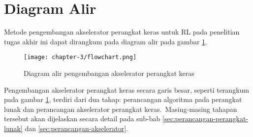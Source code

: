 \section{Diagram Alir}

Metode pengembangan akselerator perangkat keras untuk \ac{RL} pada penelitian tugas akhir ini dapat dirangkum pada diagram alir pada gambar \ref{fig:flowchart-pengembangan}.

\begin{figure}[h]
	\centering
	\texttt{[image: chapter-3/flowchart.png]}
	\caption{Diagram alir pengembangan akselerator perangkat keras}
	\label{fig:flowchart-pengembangan}
\end{figure}

Pengembangan akselerator perangkat keras secara garis besar, seperti terangkum pada gambar \ref{fig:flowchart-pengembangan}, terdiri dari dua tahap: perancangan algoritma pada perangkat lunak dan perancangan akselerator perangkat keras.\ Masing-masing tahapan tersebut akan dijelaskan secara detail pada sub-bab \ref{sec:perancangan-perangkat-lunak} dan \ref{sec:perancangan-akselerator}.
